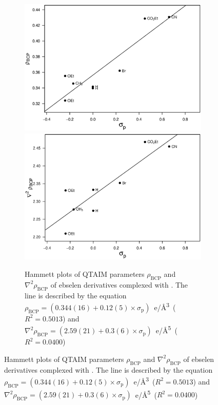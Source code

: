\begin{refsection}
\begin{figure}
\begin{subfigure}{\linewidth}
  \centering
  \includegraphics[width=0.45\linewidth]{Figures/hammett-rho-morph-p.eps}
  \includegraphics[width=0.45\linewidth]{Figures/hammett-lapl-morph-p.eps}
  \caption[Hammett plots of QTAIM parameters $\rho_\text{BCP}$ and $\nabla^2\rho_{\text{BCP}}$ of ebselen derivatives complexed with .]{Hammett plots of QTAIM parameters $\rho_\text{BCP}$ and $\nabla^2\rho_{\text{BCP}}$ of ebselen derivatives complexed with . The line is described by the equation $\rho_{\text{BCP}} = (0.344(16) + 0.12(5) \times \sigma_\text{p})$~e/\AA\textsuperscript{3}~($R^2=0.5013$) and $\nabla^2\rho_{\text{BCP}} = (2.59(21) + 0.3(6) \times \sigma_\text{p})$~e/\AA\textsuperscript{5}~($R^2=0.0400$)}\label{fig:hammett-qtaim-morph}
\end{subfigure}


\end{figure}
\end{refsection}
